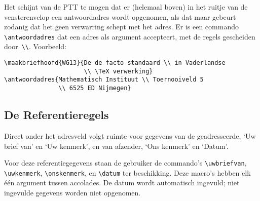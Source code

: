 Het schijnt van de PTT te mogen dat er (helemaal boven) in het ruitje           
van de vensterenvelop een antwoordadres wordt opgenomen,                        
als dat maar gebeurt zodanig dat het geen verwarring                            
schept met het adres. Er is een commando \verb.\antwoordadres.                  
dat een adres als argument accepteert,                                          
met de regels gescheiden door~\verb.\\..                                        
Voorbeeld:                                                                      
\begin{verbatim}                                                                
\maakbriefhoofd{WG13}{De de facto standaard \\ in Vaderlandse                   
                      \\ \TeX verwerking}                                       
\antwoordadres{Mathematisch Instituut \\ Toernooiveld 5                         
               \\ 6525 ED Nijmegen}\end{verbatim}                               
                                                                                
                                                                                
\subsection{De Referentieregels}                                                
                                                                                
Direct onder het adresveld volgt ruimte voor gegevens                           
van de geadresseerde, `Uw brief van' en `Uw kenmerk',                           
en van afzender, `Ons kenmerk' en `Datum'.                                      
                                                                                
Voor deze referentiegegevens staan de gebruiker                                 
de commando's \verb.\uwbriefvan., \verb.\uwkenmerk.,                            
\verb.\onskenmerk., en \verb.\datum. ter beschikking.                           
Deze macro's hebben elk \'e\'en argument tussen accolades.                      
De datum wordt automatisch ingevuld; niet ingevulde                             
gegevens worden niet opgenomen.                                                 
                                                                                
